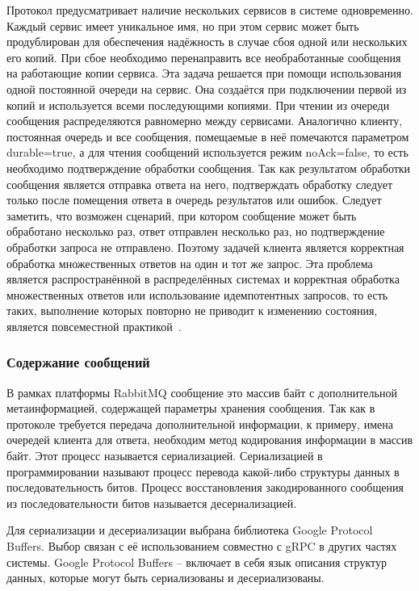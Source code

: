 Протокол предусматривает наличие нескольких сервисов в системе одновременно.
Каждый сервис имеет уникальное имя, но при этом сервис может быть продублирован
для обеспечения надёжность в случае сбоя одной или нескольких его копий.
При сбое необходимо перенаправить все необработанные сообщения на работающие
копии сервиса. Эта задача решается при помощи использования одной постоянной
очереди на сервис. Она создаётся при подключении первой из копий и используется
всеми последующими копиями. При чтении из очереди сообщения распределяются
равномерно между сервисами. Аналогично клиенту, постоянная очередь и все
сообщения, помещаемые в неё помечаются параметром durable=true, а для чтения
сообщений используется режим noAck=false, то есть необходимо подтверждение
обработки сообщения. Так как результатом обработки сообщения является
отправка ответа на него, подтверждать обработку следует только после
помещения ответа в очередь результатов или ошибок. Следует заметить,
что возможен сценарий, при котором сообщение может быть обработано несколько
раз, ответ отправлен несколько раз, но подтверждение обработки запроса
не отправлено. Поэтому задачей клиента является корректная обработка
множественных ответов на один и тот же запрос. Эта проблема является
распространённой в распределённых системах и корректная обработка множественных
ответов или использование идемпотентных запросов, то есть таких, выполнение
которых повторно не приводит к изменению состояния, является повсеместной
практикой~\cite{distributed}.

\subsubsection{Содержание сообщений}
В рамках платформы RabbitMQ сообщение это массив байт с дополнительной
метаинформацией, содержащей параметры хранения сообщения. Так как в протоколе
требуется передача дополнительной информации, к примеру, имена очередей
клиента для ответа, необходим метод кодирования информации в массив байт.
Этот процесс называется сериализацией. Сериализацией в программировании
называют процесс перевода какой-либо структуры данных в последовательность
битов. Процесс восстановления закодированного сообщения из последовательности
битов называется десериализацией.

Для сериализации и десериализации выбрана библиотека Google Protocol Buffers.
Выбор связан с её использованием совместно с gRPC в других частях системы.
Google Protocol Buffers -- включает в себя язык описания структур данных,
которые могут быть сериализованы и десериализованы.

